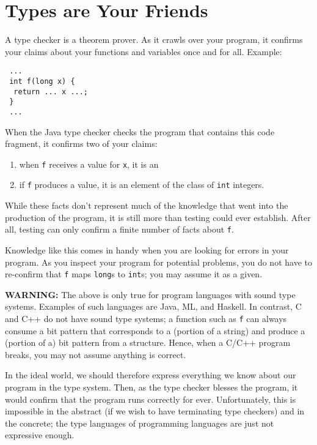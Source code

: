 \documentclass[11pt]{article}
\begin{document}


\section{Types are Your Friends}

A type checker is a theorem prover. As it crawls over your program, it
  confirms your claims about your functions and variables once and for
  all. Example: 


\begin{verbatim}
 ...
 int f(long x) { 
  return ... x ...; 
 }
 ...
\end{verbatim}

When the Java type checker checks the program that contains this code
  fragment, it confirms two of your claims:
\begin{enumerate}
\item when {\tt f} receives a value for {\tt x}, it is an

\item if {\tt f} produces a value, it is an element of the class of
{\tt int} integers.

\end{enumerate}
While these facts don't represent much of the knowledge that went into the
production of the program, it is still more than testing could ever
establish. After all, testing can only confirm a finite number of facts
about {\tt f}.

Knowledge like this comes in handy when you are looking for errors in
  your program. As you inspect your program for potential problems, you do
  not have to re-confirm that {\tt f} maps {\tt long}s to
  {\tt int}s; you may assume it as a given.

{\bf WARNING:} The above is only true for program languages with sound
  type systems. Examples of such languages are Java, ML, and Haskell. In
  contrast, C and C++ do not have sound type systems; a function such as
  {\tt f} can always consume a bit pattern that corresponds to a
  (portion of a string) and produce a (portion of a) bit pattern from a
  structure. Hence, when a C/C++ program breaks, you may not assume
  anything is correct. 


In the ideal world, we should therefore express everything we know about
  our program in the type system. Then, as the type checker blesses the
  program, it would confirm that the program runs correctly for
  ever. Unfortunately, this is impossible in the abstract (if we wish to
  have terminating type checkers) and in the concrete; the type languages
  of programming languages are just not expressive enough. 
\end{document}
